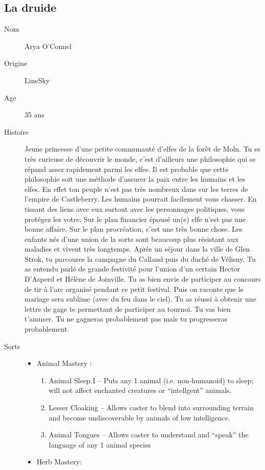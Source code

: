 \documentclass[oneside,12pt]{book}
\begin{document}
\begin{flushleft}
\subsection{La druide}
\begin{description}
\item[Nom]{Arya O'Connel}
\item[Origine]{LineSky}
\item[Age]{35 ans}
\item[Histoire]{
\small Jeune princesse d'une petite communauté d'elfes de la forêt de Moln. Tu es très curieuse de découvrir le monde, c'est d'ailleurs une philosophie 
qui se répand assez rapidement parmi les elfes. Il est probable que cette philosophie soit une méthode d'assurer la paix entre les humains et les elfes. En effet ton peuple n'est pas très nombreux dans sur les terres de l'empire de Castleberry. Les humains pourrait facilement vous chasser. En tissant des liens avec eux surtout avec les personnages politiques, vous protégez les votre. Sur le plan financier épousé un(e) elfe n'est pas une bonne affaire. Sur le plan procréation, c'est une très bonne chose. Les enfants nés d'une union de la sorte sont beaucoup plus résistant aux maladies et vivent très longtemps.
Après un séjour dans la ville de Glen Strok, tu parcoures la campagne du Calland puis du duché de Vélisny. Tu as entendu parlé de grande festivité pour l'union d'un certain Hector D'Asperd et Hélène de Joinville. Tu as bien envie de participer au concours de tir à l'arc organisé pendant ce petit festival. Puis on raconte que le mariage sera sublime (avec du feu dans le ciel). Tu as réussi à obtenir une lettre de gage te permettant de participer au tournoi. Tu vas bien t'amuser. Tu ne gagneras probablement pas mais tu progresseras probablement.}
\item[Sorts]{
\begin{itemize}
\item Animal Mastery :
\begin{enumerate}
\scriptsize
\item Animal Sleep I – Puts any 1 animal (i.e. non-humanoid)
to sleep; will not affect enchanted creatures or
“intellgent” animals.
\item Lesser Cloaking – Allows caster to blend into
surrounding terrain and become undiscoverable by
animals of low intelligence.
\item Animal Tongues – Allows caster to understand and
“speak” the language of any 1 animal species
\end{enumerate}
\item Herb Mastery:

\end{itemize}}
\end{description}
\end{flushleft}
\end{document}
